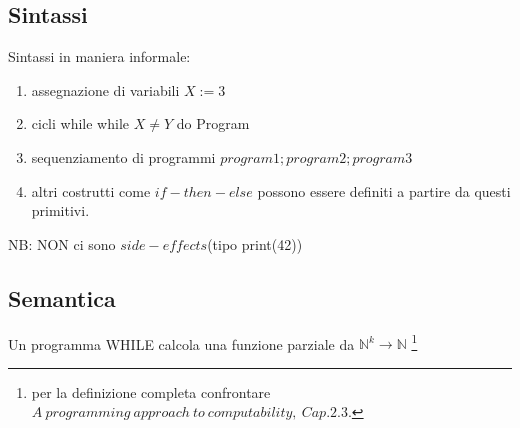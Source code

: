 \documentclass[a4paper, 12pt]{article}
\begin{document}
\subsection{Sintassi}
Sintassi in maniera informale:
\begin{enumerate}
\item assegnazione di variabili $X:=3$
\item cicli while   while $X \neq Y$ do Program
\item sequenziamento di programmi  $program1; program2; program3$
\item altri costrutti come $if-then-else$ possono essere definiti a partire da questi primitivi.
\end{enumerate} 
NB: NON ci sono $side-effects$(tipo print(42))
\subsection{Semantica}
Un programma WHILE calcola una funzione parziale da $\mathbb{N}^{k} \rightarrow \mathbb{N}$ \footnote{per la definizione completa confrontare $A\ programming\ approach\ to\ computability,\ Cap.2.3.$}
\end{document}
